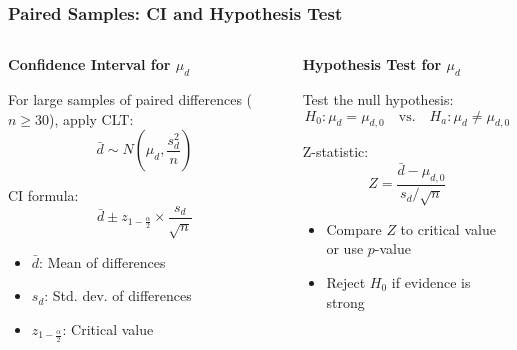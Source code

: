 \documentclass[handout]{beamer}
\begin{document}
\begin{frame}
\frametitle{Paired Samples: CI and Hypothesis Test}
\small
\begin{columns}[t]
    \begin{column}{0.48\textwidth}
    \textbf{Confidence Interval for $\mu_d$}

    \vspace{0.5em}
    For large samples of paired differences ($n \ge 30$), apply CLT:
    \[
    \bar{d} \sim N\left(\mu_d, \frac{s_d^2}{n}\right)
    \]

    \vspace{0.3em}
    CI formula:
    \[
    \bar{d} \pm z_{1-\frac{\alpha}{2}} \times \frac{s_d}{\sqrt{n}}
    \]

    \vspace{0.3em}
    \begin{itemize}
        \item $\bar{d}$: Mean of differences
        \item $s_d$: Std. dev. of differences
        \item $z_{1-\frac{\alpha}{2}}$: Critical value
    \end{itemize}
    \end{column}

    \begin{column}{0.48\textwidth}
    \textbf{Hypothesis Test for $\mu_d$}

    \vspace{0.5em}
    Test the null hypothesis:
    \[
    H_0: \mu_d = \mu_{d,0} \quad \text{vs.} \quad H_a: \mu_d \neq \mu_{d,0}
    \]

    \vspace{0.3em}
    Z-statistic:
    \[
    Z = \frac{\bar{d} - \mu_{d,0}}{s_d / \sqrt{n}}
    \]

    \vspace{0.3em}
    \begin{itemize}
        \item Compare $Z$ to critical value or use $p$-value
        \item Reject $H_0$ if evidence is strong
    \end{itemize}
    \end{column}
\end{columns}

\end{frame}
\end{document}
